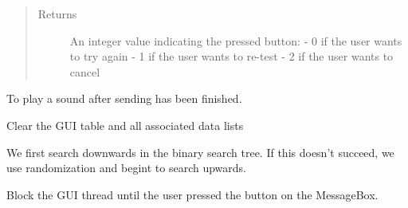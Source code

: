 \documentclass[letterpaper,10pt,english]{sphinxmanual}
\begin{document}
\begin{fulllineitems}
\begin{fulllineitems}
\begin{description}
\begin{itemize}
\end{itemize}

\end{description}
\begin{quote}\begin{description}
\item[{Returns}] \leavevmode
An integer value indicating the pressed button:
- 0 if the user wants to try again
- 1 if the user wants to re-test
- 2 if the user wants to cancel

\end{description}\end{quote}

\end{fulllineitems}


\begin{fulllineitems}
\label{\detokenize{src:src.SearcherTab.SearcherTab.beep}}
To play a sound after sending has been finished.

\end{fulllineitems}


\begin{fulllineitems}
\label{\detokenize{src:src.SearcherTab.SearcherTab.clear}}
Clear the GUI table and all associated data lists

\end{fulllineitems}


\begin{fulllineitems}
\label{\detokenize{src:src.SearcherTab.SearcherTab.downwardsSearch}}
We first search downwards in the binary search tree. If this doesn’t
succeed, we use randomization and begint to search upwards.

\end{fulllineitems}


\begin{fulllineitems}
\label{\detokenize{src:src.SearcherTab.SearcherTab.enterWhenReady}}
Block the GUI thread until the user pressed the button on the MessageBox.


\end{fulllineitems}
\end{fulllineitems}
\end{document}
